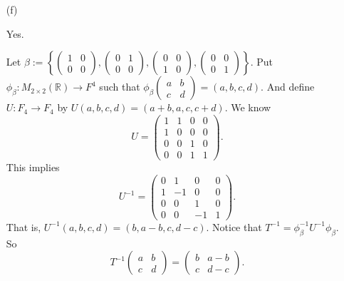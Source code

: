 \begin{Exercise}
\begin{enumerate}[(a)]
\item[(f)]
\begin{answer}
Yes.
\end{answer}
\begin{solution}
Let $\beta := \left\{\begin{pmatrix}
1 & 0 \\
0 & 0 
\end{pmatrix}, \begin{pmatrix}
0 & 1 \\
0 & 0
\end{pmatrix}, \begin{pmatrix}
0 & 0 \\
1 & 0
\end{pmatrix}, \begin{pmatrix}
0 & 0 \\
0 & 1
\end{pmatrix} \right\}$. Put $\phi_{\beta}:M_{2\times 2}(\mathbb{R}) \to F^4$ such that $\phi_{\beta}\begin{pmatrix}
a & b \\
c & d
\end{pmatrix} = (a,b,c,d)$. And define $U:F_4\to F_4$ by $U(a,b,c,d) = (a+b,a,c,c+d)$. We know
$$
U = \begin{pmatrix}
1 & 1 & 0 & 0 \\
1 & 0 & 0 & 0 \\
0 & 0 & 1 & 0 \\
0 & 0 & 1 & 1
\end{pmatrix}.
$$
This implies
$$
U^{-1} = \begin{pmatrix}
0 & 1 & 0 & 0 \\
1 & -1 & 0 & 0 \\
0 & 0 & 1 & 0 \\
0 & 0 & -1 & 1
\end{pmatrix}.
$$
That is, $U^{-1}(a,b,c,d) = (b,a-b,c,d-c)$. Notice that $T^{-1} = \phi_{\beta}^{-1} U^{-1} \phi_{\beta}$. So
$$
T^{-1}\begin{pmatrix}
a & b \\
c & d
\end{pmatrix} = \begin{pmatrix}
b & a-b \\
c & d-c
\end{pmatrix}.
$$
\end{solution}

\end{enumerate}
\end{Exercise}